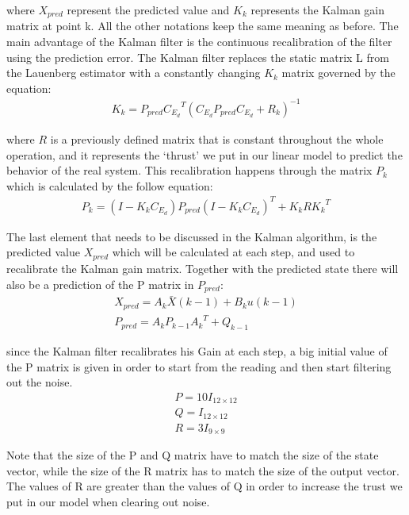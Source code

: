 \documentclass[conference]{IEEEtran}
\begin{document}
\par
where $X_{pred}$ represent the predicted value and $K_k$ represents the Kalman
gain matrix at point k. All the other notations keep the same meaning as
before. The main advantage of the Kalman filter is the continuous recalibration
of the filter using the prediction error. The Kalman filter replaces the static
matrix L from the Lauenberg estimator with a constantly changing $K_k$ matrix
governed by the equation:
\begin{align}
    K_k=P_{pred}{C_{E_d}}^T{(C_{E_d}P_{pred}C_{E_d}+R_k)}^{-1}
\end{align}
\par
where $R$ is a previously defined matrix that is constant throughout the whole
operation, and it represents the `thrust' we put in our linear model to predict
the behavior of the real system. This recalibration happens through the matrix
$P_k$ which is calculated by the follow equation:
\begin{align}
    P_k=(I-K_{k}C_{E_d})P_{pred}{(I-K_{k}C_{E_d})}^T+K_{k}R{K_k}^T
    \label{KalmanPRecalibration}
\end{align}
\par
The last element that needs to be discussed in the Kalman algorithm, is the
predicted value $X_{pred}$ which will be calculated at each step, and used to
recalibrate the Kalman gain matrix. Together with the predicted state there
will also be a prediction of the P matrix in $P_{pred}$:
\begin{align}
    X_{pred}=A_k\bar{X}(k-1)+B_{k}u(k-1) \\
    P_{pred}=A_{k}P_{k-1}{A_k}^T+Q_{k-1}
    \label{KalmanPrediction}
\end{align}
\par
since the Kalman filter recalibrates his Gain at each step, a big initial value
of the P matrix is given in order to start from the reading and then start
filtering out the noise.
\begin{align}
    P=10I_{12\times12} \\
    Q=I_{12\times12}   \\
    R=3I_{9\times9}
    \label{MatrixValuesOfKalman}
\end{align}
\par
Note that the size of the P and Q matrix have to match the size of the state
vector, while the size of the R matrix has to match the size of the output
vector. The values of R are greater than the values of Q in order to increase
the trust we put in our model when clearing out noise.
\end{document}
